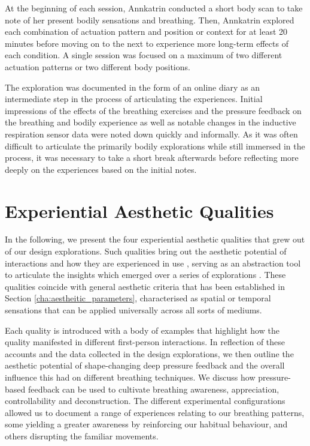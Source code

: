 At the beginning of each session, Annkatrin conducted a short body scan to take note of her present bodily sensations and breathing. Then, Annkatrin explored each combination of actuation pattern and position or context for at least 20 minutes before moving on to the next to experience more long-term effects of each condition. A single session was focused on a maximum of two different actuation patterns or two different body positions.

The exploration was documented in the form of an online diary as an intermediate step in the process of articulating the experiences. Initial impressions of the effects of the breathing exercises and the pressure feedback on the breathing and bodily experience as well as notable changes in the inductive respiration sensor data were noted down quickly and informally. As it was often difficult to articulate the primarily bodily explorations while still immersed in the process, it was necessary to take a short break afterwards before reflecting more deeply on the experiences based on the initial notes.


\section{Experiential Aesthetic Qualities}
\label{sec:aesthetic_qualities}

In the following, we present the four experiential aesthetic qualities that grew out of our design explorations. Such qualities bring out the aesthetic potential of interactions and how they are experienced in use \cite{lowgren_toward_2009}, serving as an abstraction tool to articulate the insights which emerged over a series of explorations \cite{stahl_evocative_2014}. These qualities coincide with general aesthetic criteria that has been established in Section \ref{cha:aestheitic_parameters}, characterised as spatial or temporal sensations that can be applied universally across all sorts of mediums.

Each quality is introduced with a body of examples that highlight how the quality manifested in different first-person interactions. In reflection of these accounts and the data collected in the design explorations, we then outline the aesthetic potential of shape-changing deep pressure feedback and the overall influence this had on different breathing techniques. We discuss how pressure-based feedback can be used to cultivate breathing awareness, appreciation, controllability and deconstruction. The different experimental configurations allowed us to document a range of experiences relating to our breathing patterns, some yielding a greater awareness by reinforcing our habitual behaviour, and others disrupting the familiar movements.
%

